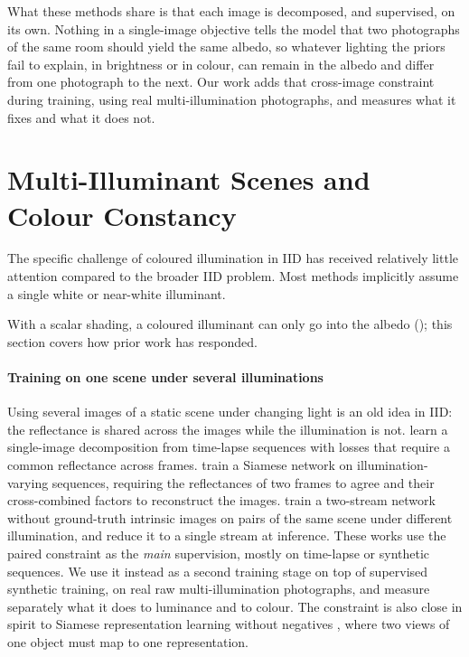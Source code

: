 What these methods share is that each image is decomposed, and supervised, on its own.
Nothing in a single-image objective tells the model that two photographs of the same
room should yield the same albedo, so whatever lighting the priors fail to explain, in
brightness or in colour, can remain in the albedo and differ from one photograph to the
next. Our work adds that cross-image constraint during training, using real
multi-illumination photographs, and measures what it fixes and what it does not.


\section{Multi-Illuminant Scenes and Colour Constancy}
\label{sec:multiillum}

The specific challenge of coloured illumination in IID has received relatively
little attention compared to the broader IID problem.
Most methods implicitly assume a single white or near-white illuminant.

With a scalar shading, a coloured illuminant can only go into the albedo
(); this section covers how prior work has responded.

\paragraph{Training on one scene under several illuminations}
Using several images of a static scene under changing light is an old idea in IID:
the reflectance is shared across the images while the illumination is not.
 learn a single-image decomposition from time-lapse sequences
with losses that require a common reflectance across frames.
 train a Siamese network on illumination-varying
sequences, requiring the reflectances of two frames to agree and their cross-combined
factors to reconstruct the images.
 train a two-stream network without ground-truth intrinsic images on
pairs of the same scene under different illumination, and reduce it to a single stream at
inference. These works use the paired constraint as the \emph{main} supervision, mostly on
time-lapse or synthetic sequences. We use it instead as a second training stage on top of
supervised synthetic training, on real raw multi-illumination photographs, and measure
separately what it does to luminance and to colour. The constraint is also close in spirit
to Siamese representation learning without negatives , where two
views of one object must map to one representation.


